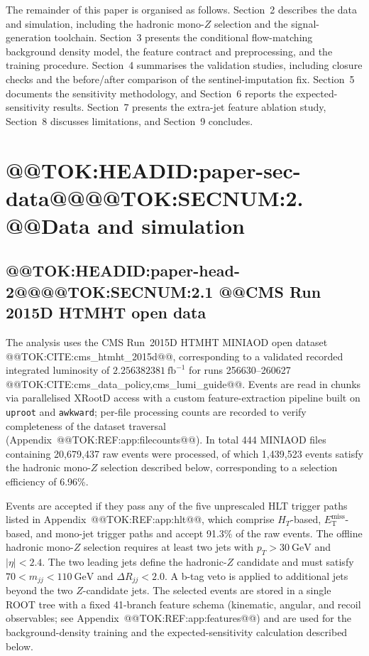 \documentclass[11pt]{article}
\newcommand{\GeV}{\text{GeV}}
\newcommand{\MET}{\ensuremath{E_{\mathrm{T}}^{\mathrm{miss}}}}
\newcommand{\invfb}{\ensuremath{\mathrm{fb}^{-1}}}
\begin{document}
The remainder of this paper is organised as follows. Section~2 describes the
data and simulation, including the hadronic mono-$Z$ selection and the
signal-generation toolchain. Section~3 presents the conditional flow-matching
background density model, the feature contract and preprocessing, and the
training procedure. Section~4 summarises the validation studies, including
closure checks and the before/after comparison of the sentinel-imputation
fix. Section~5 documents the sensitivity methodology, and Section~6 reports
the expected-sensitivity results. Section~7 presents the extra-jet feature
ablation study, Section~8 discusses limitations, and Section~9 concludes.
\section{@@TOK:HEADID:paper-sec-data@@@@TOK:SECNUM:2. @@Data and simulation}

\subsection{@@TOK:HEADID:paper-head-2@@@@TOK:SECNUM:2.1 @@CMS Run 2015D HTMHT open data}

The analysis uses the CMS Run~2015D HTMHT MINIAOD open dataset
@@TOK:CITE:cms_htmht_2015d@@, corresponding to a validated recorded integrated
luminosity of $2.256382381~\invfb$ for runs 256630--260627
@@TOK:CITE:cms_data_policy,cms_lumi_guide@@. Events are read in chunks via
parallelised XRootD access with a custom feature-extraction pipeline built on
\texttt{uproot} and \texttt{awkward}; per-file processing counts are recorded
to verify completeness of the dataset traversal
(Appendix~@@TOK:REF:app:filecounts@@). In total 444 MINIAOD files containing
20{,}679{,}437 raw events were processed, of which 1{,}439{,}523 events
satisfy the hadronic mono-$Z$ selection described below, corresponding to a
selection efficiency of 6.96\%.

Events are accepted if they pass any of the five unprescaled HLT trigger
paths listed in Appendix~@@TOK:REF:app:hlt@@, which comprise $H_T$-based,
\MET-based, and mono-jet trigger paths and accept 91.3\% of the raw events.
The offline hadronic mono-$Z$ selection requires at least two jets with
$p_T > 30~\GeV$ and $|\eta| < 2.4$. The two leading jets define the
hadronic-$Z$ candidate and must satisfy $70 < m_{jj} < 110~\GeV$ and
$\Delta R_{jj} < 2.0$. A b-tag veto is applied to additional jets beyond the
two $Z$-candidate jets. The selected events are stored in a single ROOT tree
with a fixed 41-branch feature schema (kinematic, angular, and recoil
observables; see Appendix~@@TOK:REF:app:features@@) and are used for the
background-density training and the expected-sensitivity calculation
described below.
\end{document}

